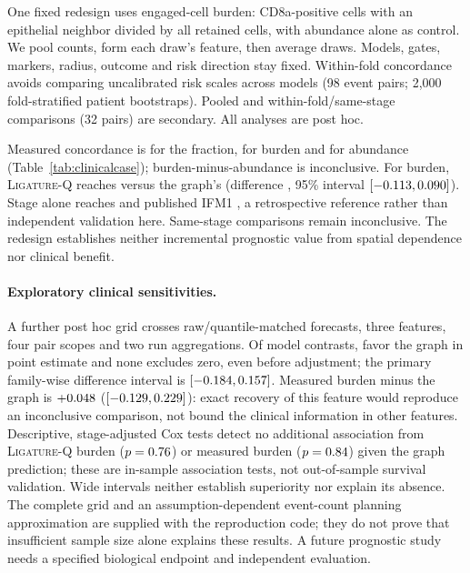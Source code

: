 \documentclass[10pt,letterpaper]{article}
\theoremstyle{definition}
\theoremstyle{remark}
\newcommand{\method}{\textnormal{\textsc{Ligature}}}
\begin{document}
One fixed redesign uses engaged-cell burden: CD8a-positive cells with an epithelial neighbor divided by all retained cells, with abundance alone as control. We pool counts, form each draw's feature, then average draws. Models, gates, markers, radius, outcome and risk direction stay fixed. Within-fold concordance avoids comparing uncalibrated risk scales across models (98 event pairs; 2,000 fold-stratified patient bootstraps). Pooled and within-fold/same-stage comparisons (32 pairs) are secondary. All analyses are post hoc.

Measured concordance is \BioMeasuredContactC{} for the fraction, \BioMeasuredBurdenC{} for burden and \BioMeasuredAbundanceC{} for abundance (Table~\ref{tab:clinicalcase}); burden-minus-abundance is inconclusive. For burden, \method{}-Q reaches \BioLigBurdenC{} versus the graph's \BioDirectBurdenC{} (difference \BioBurdenDelta, 95\% interval $[-0.113,0.090]$). Stage alone reaches \BioStageC{} and published IFM1 \BioIFMC{}, a retrospective reference rather than independent validation here. Same-stage comparisons remain inconclusive. The redesign establishes neither incremental prognostic value from spatial dependence nor clinical benefit.

\begin{table}[!htp]
\centering
\caption{Exploratory within-fold progression-free-survival concordance, 39 patients. Higher features are favorable. Burden uses all cells; abundance omits contact. All reported model/feature-difference intervals include zero.}
\label{tab:clinicalcase}

\end{table}

\paragraph{Exploratory clinical sensitivities.} A further post hoc grid crosses raw/quantile-matched forecasts, three features, four pair scopes and two run aggregations. Of \CliGridTotal{} model contrasts, \CliGridDirect{} favor the graph in point estimate and none excludes zero, even before adjustment; the primary family-wise difference interval is $[-0.184,0.157]$. Measured burden minus the graph is $+0.048$ ($[-0.129,0.229]$): exact recovery of this feature would reproduce an inconclusive comparison, not bound the clinical information in other features. Descriptive, stage-adjusted Cox tests detect no additional association from \method{}-Q burden ($p=0.76$) or measured burden ($p=0.84$) given the graph prediction; these are in-sample association tests, not out-of-sample survival validation. Wide intervals neither establish superiority nor explain its absence. The complete grid and an assumption-dependent event-count planning approximation are supplied with the reproduction code; they do not prove that insufficient sample size alone explains these results. A future prognostic study needs a specified biological endpoint and independent evaluation.
\end{document}
